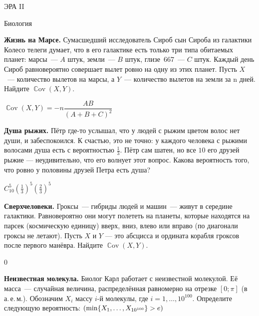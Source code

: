 \documentclass[12pt, addpoints]{exam} %
\DeclareMathOperator{\Cov}{\mathbb{C}\mathrm{ov}}
\let\P\relax
\DeclareMathOperator{\P}{\mathbb{P}}
\begin{document}
\begin{center}
ЭРА II
\end{center}

\begin{center}
Биология
\end{center}

\begin{questions}


\question \textbf{Жизнь на Марсе.} Сумасшедший исследователь Сироб сын Сироба из галактики Колесо телеги думает, что в его галактике есть только три типа обитаемых планет: марсы~--- $A$ штук, земли~--- $B$ штук, глизе~667~--- $C$ штук. Каждый день Сироб равновероятно совершает вылет ровно на одну из этих планет. Пусть $X$~--- количество вылетов на марсы, а $Y$~--- количество вылетов на земли за n дней. Найдите $\Cov (X,Y)$.

\begin{solution}
$ \Cov (X,Y) = - n \dfrac{AB}{(A+B+C)^2} $
\end{solution}

\question  \textbf{Душа рыжих.} Пётр где-то услышал, что у людей с рыжим цветом волос нет души, и забеспокоился. К счастью, это не точно: у каждого человека с рыжими волосами душа есть с вероятностью $\frac13$. Пётр сам шатен, но все $10$ его друзей рыжие ---  неудивительно, что его волнует этот вопрос. Какова вероятность того, что ровно у половины друзей Петра есть душа?

\begin{solution}
 $C_{10}^5\left(\frac{1}{3}\right)^5\left(\frac{2}{3}\right)^5$
\end{solution}

\question \textbf{Сверхчеловеки.} Гроксы~--- гибриды людей и машин~--- живут  в середине галактики. Равновероятно они могут полететь на планеты, которые находятся на парсек (космическую единицу) вверх, вниз, влево или вправо (по диагонали гроксы не летают). Пусть $X$ и $Y$ — это абсцисса и ордината корабля гроксов после первого манёвра. Найдите $\Cov (X,Y) $.

\begin{solution}
0
\end{solution}


\question \textbf{Неизвестная молекула.} Биолог Карл работает с неизвестной молекулой. Её масса~--- случайная величина, распределённая равномерно на отрезке $[0;\pi]$ (в а.\,е.\,м.). Обозначим $X_i$ массу $i$-й молекулы, где $i=1, \ldots, 10^{100}$. Определите следующую вероятность: $\P(\min\{X_1,\ldots, X_{10^{100}}\}>e)$


\end{questions}
\end{document}
